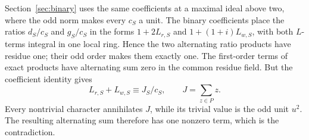 Section~\ref{sec:binary} uses the same coefficients at a maximal
ideal above two, where the odd norm makes every \(c_S\) a unit.
The binary coefficients place the ratios \(d_S/c_S\) and \(g_S/c_S\)
in the forms \(1+2L_{r,S}\) and \(1+(1+i)L_{w,S}\), with both
\(L\)-terms integral in one local ring. Hence the two alternating
ratio products have residue one; their odd order makes them exactly
one. The first-order terms of exact products have alternating sum
zero in the common residue field. But the coefficient identity gives
\[
 L_{r,S}+L_{w,S}\equiv J_S/c_S,
 \qquad J=\sum_{z\in P}z.
\]
Every nontrivial character annihilates \(J\), while its trivial value
is the odd unit \(u^2\). The resulting alternating sum therefore has
one nonzero term, which is the contradiction.
